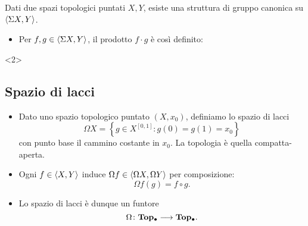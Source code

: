 \begin{frame*}
\begin{overlayarea}{\textwidth}{.825\textheight}
Dati due spazi topologici puntati $X,Y$, esiste una struttura di gruppo canonica su $\langle \Sigma X,Y\rangle$.
\begin{itemize}
\item<2-> Per $f,g\in\langle \Sigma X,Y\rangle$, il prodotto $f\cdot g$ è così definito:
\end{itemize}
\begin{onlyenv}<2>
\begin{center}
\end{center}
\end{onlyenv}
\end{overlayarea}
\end{frame*}

\subsection*{Spazio di lacci}
\begin{frame*}
\begin{itemize}
\item Dato uno spazio topologico puntato $(X,x_0)$, definiamo lo spazio di lacci
\[
\Omega X=\left\{g\in X^{[0,1]}:g(0)=g(1)=x_0\right\}
\]
con punto base il cammino costante in $x_0$. La topologia è quella compatta-aperta.
\item Ogni $f\in\langle X,Y\rangle$ induce $\Omega f\in\langle \Omega X,\Omega Y\rangle$ per composizione:
\[
\Omega f(g)=f\circ g.
\]
 \item Lo spazio di lacci è dunque un funtore
\[
\map{\Omega}{\Top0}{\Top0}.
\]
\end{itemize}
\end{frame*}

